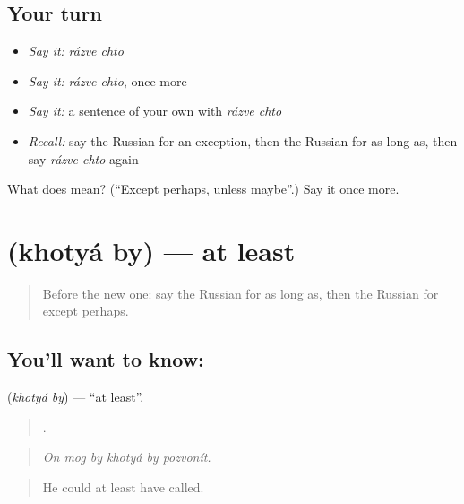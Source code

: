 \subsection*{Your turn}
\begin{itemize}
\raggedright
  \item \emph{Say it:} \emph{rázve chto}
  \item \emph{Say it:} \emph{rázve chto}, once more
  \item \emph{Say it:} a sentence of your own with \emph{rázve chto}
  \item \emph{Recall:} say the Russian for an exception, then the Russian for as long as, then say \emph{rázve chto} again
\end{itemize}

\begin{tcolorbox}[breakable,colback=teal!4,colframe=teal!35!black,title={Before you move on}]
What does   mean? (\textquotedblleft{}Except perhaps, unless maybe\textquotedblright{}.) Say it once more.
\end{tcolorbox}
\section[\texorpdfstring{\ru{хотя} \ru{бы} (khotyá by)}{хотя бы (khotyá by)}]{  (khotyá by) — at least}

\label{lesson:RU-C376-khotya-by}



\begin{quote}
Before the new one: say the Russian for as long as, then the Russian for except perhaps.
\end{quote}

\subsection*{You'll want to know:  }
\textbf{ } (\emph{khotyá by}) — \textquotedblleft{}at least\textquotedblright{}.

\begin{quote}
     .
\end{quote}

\begin{quote}
\emph{On mog by khotyá by pozvonít.}
\end{quote}

\begin{quote}
He could at least have called.
\end{quote}


